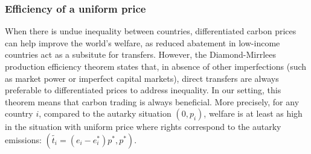 \documentclass[12pt,english]{article}
\begin{document}


\subsubsection*{Efficiency of a uniform price} \label{efficiency-of-a-uniform-price}

When there is undue inequality between countries, differentiated carbon prices can help improve the world's welfare, as reduced abatement in low-income countries act as a subsitute for transfers. However, the Diamond-Mirrlees production efficiency theorem states that, in absence of other imperfections (such as market power or imperfect capital markets), direct transfers are always preferable to differentiated prices to address inequality.\citep{diamond_optimal_1971} In our setting, this theorem means that carbon trading is always beneficial.  
More precisely, for any country $i$, compared to the autarky situation $(0,p_i)$, welfare is at least as high in the situation with uniform price where rights correspond to the autarky emissions: $(\widetilde{t_i}=(e_i - e^*_i)p^* ,p^*)$. 


\end{document}
